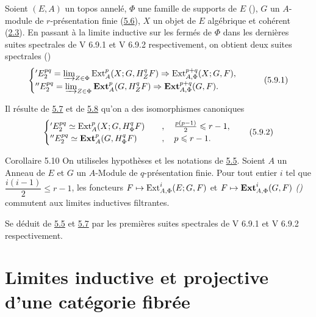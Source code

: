 \documentclass[10pt]{../fichiers-configuration-latex/smfart}
\begin{document}
Soient $(E, A)$ un topos annelé, $\Phi$ une famille de supports de $E$
(), $G$ un $A$-module de $r$-présentation finie (\hyperref[VI.def5.6]{5.6}), $X$ un
objet de $E$ algébrique et cohérent (\hyperref[VI.def2.3]{2.3}). En passant à la limite
inductive sur les fermés de $\Phi$ dans les dernières suites
spectrales de V 6.9.1 et V 6.9.2 respectivement, on obtient deux
suites spectrales ()
\begin{equation*}
\begin{cases}
'E^{pq}_2 = \varinjlim_{Z \in \Phi} \operatorname{Ext}^p_A (X; G, H^q_Z F)
\Rightarrow \operatorname{Ext}^{p+q}_{A, \Phi} (X; G, F){},\\
''E^{pq}_2 = \varinjlim_{Z \in \Phi} \operatorname{\mathbf{Ext}}^p_A (G, H^q_Z F)
\Rightarrow \operatorname{\mathbf{Ext}}^{p+q}_{A, \Phi} (G, F){}.
\end{cases}\tag{5.9.1}
\end{equation*}

Il résulte de \hyperref[VI.prop5.7]{5.7} et de \hyperref[VI.cor5.8]{5.8} qu'on a des
isomorphismes canoniques
\begin{equation*}
\begin{cases}
'E^{pq}_2 \simeq \operatorname{Ext}^p_A (X; G, H^q_\Phi F)&\quad,\quad \frac{p(p-1)}{2} \leqslant r - 1{},\\
''E^{pq}_2 \simeq \operatorname{\mathbf{Ext}}^p_A (G, H^q_\Phi F) &\quad,\quad p \leqslant r-1{}.
\end{cases}\tag{5.9.2}
\end{equation*}

\begin{enonce*}{Corollaire 5.10}
On utilise\pageoriginale les hypothèses et les notations de \hyperref[VI.cor5.5]{5.5}.
Soient $A$ un Anneau de $E$ et $G$ un $A$-Module de $q$-présentation finie. Pour
tout entier $i$ tel que $\dfrac{i(i - 1)}{2} \leq r - 1$, les
foncteurs $F \mapsto \operatorname{Ext}^i_{A, \Phi} (E; G, F)$ et $F \mapsto
\operatorname{\mathbf{Ext}}^i_{A, \Phi} (G, F)$ \emph{()} commutent aux limites
inductives filtrantes.
\end{enonce*}

Se déduit de \hyperref[VI.cor5.5]{5.5} et \hyperref[VI.prop5.7]{5.7} par les premières suites spectrales de V 6.9.1
et V 6.9.2 respectivement.

\section{Limites inductive et projective d'une catégorie fibrée}
\end{document}
